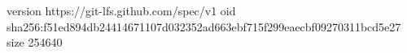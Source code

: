 version https://git-lfs.github.com/spec/v1
oid sha256:f51ed894db24414671107d032352ad663ebf715f299eaecbf09270311bcd5e27
size 254640
